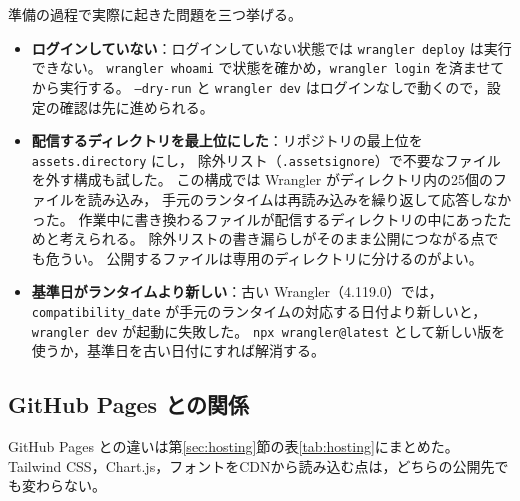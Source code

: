 \documentclass[paper=a4,fontsize=10pt]{jlreq}
\newcommand{\code}[1]{\texttt{#1}}
\begin{document}
準備の過程で実際に起きた問題を三つ挙げる。
\begin{itemize}
  \item \textbf{ログインしていない}：ログインしていない状態では \code{wrangler deploy} は実行できない。
    \code{wrangler whoami} で状態を確かめ，\code{wrangler login} を済ませてから実行する。
    \code{--dry-run} と \code{wrangler dev} はログインなしで動くので，設定の確認は先に進められる。
  \item \textbf{配信するディレクトリを最上位にした}：リポジトリの最上位を \code{assets.directory} にし，
    除外リスト（\code{.assetsignore}）で不要なファイルを外す構成も試した。
    この構成では Wrangler がディレクトリ内の25個のファイルを読み込み，
    手元のランタイムは再読み込みを繰り返して応答しなかった。
    作業中に書き換わるファイルが配信するディレクトリの中にあったためと考えられる。
    除外リストの書き漏らしがそのまま公開につながる点でも危うい。
    公開するファイルは専用のディレクトリに分けるのがよい。
  \item \textbf{基準日がランタイムより新しい}：古い Wrangler（4.119.0）では，
    \code{compatibility\_date} が手元のランタイムの対応する日付より新しいと，\code{wrangler dev} が起動に失敗した。
    \code{npx wrangler@latest} として新しい版を使うか，基準日を古い日付にすれば解消する。
\end{itemize}

\subsection{GitHub Pages との関係}

GitHub Pages との違いは第\ref{sec:hosting}節の表\ref{tab:hosting}にまとめた。
Tailwind CSS，Chart.js，フォントをCDNから読み込む点は，どちらの公開先でも変わらない。
\end{document}
